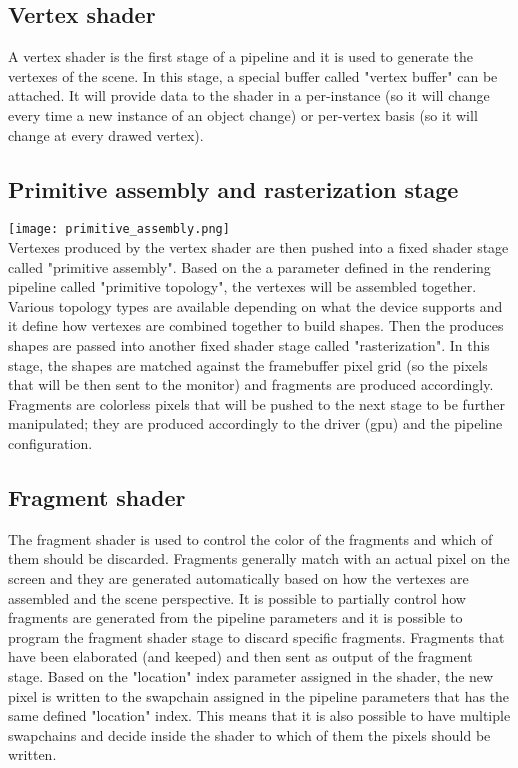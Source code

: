 \subsection{Vertex shader}
A vertex shader is the first stage of a pipeline and it is used to generate the vertexes of the scene. In this stage, a special buffer called "vertex buffer" can be attached. It will provide data to the shader in a per-instance (so it will change every time a new instance of an object change) or per-vertex basis (so it will change at every drawed vertex).

\newpage
\subsection{Primitive assembly and rasterization stage}
\begin{multicols}{2}
	\vspace*{\fill}
	\centering
	\texttt{[image: primitive\_assembly.png]}\\
	\label{pinki}
	\vspace*{\fill}
	\columnbreak
	\vspace*{\fill}
	Vertexes produced by the vertex shader are then pushed into a fixed shader stage called "primitive assembly". Based on the a parameter defined in the rendering pipeline called "primitive topology", the vertexes will be assembled together. Various topology types are available depending on what the device supports and it define how vertexes are combined together to build shapes. Then the produces shapes are passed into another fixed shader stage called "rasterization". In this stage, the shapes are matched against the framebuffer pixel grid (so the pixels that will be then sent to the monitor) and fragments are produced accordingly. Fragments are colorless pixels that will be pushed to the next stage to be further manipulated; they are produced accordingly to the driver (gpu) and the pipeline configuration.
	\vspace*{\fill}
\end{multicols}

\subsection{Fragment shader}
The fragment shader is used to control the color of the fragments and which of them should be discarded. Fragments generally match with an actual pixel on the screen and they are generated automatically based on how the vertexes are assembled and the scene perspective. It is possible to partially control how fragments are generated from the pipeline parameters and it is possible to program the fragment shader stage to discard specific fragments. Fragments that have been elaborated (and keeped) and then sent as output of the fragment stage. Based on the "location" index parameter assigned in the shader, the new pixel is written to the swapchain assigned in the pipeline parameters that has the same defined "location" index. This means that it is also possible to have multiple swapchains and decide inside the shader to which of them the pixels should be written.

